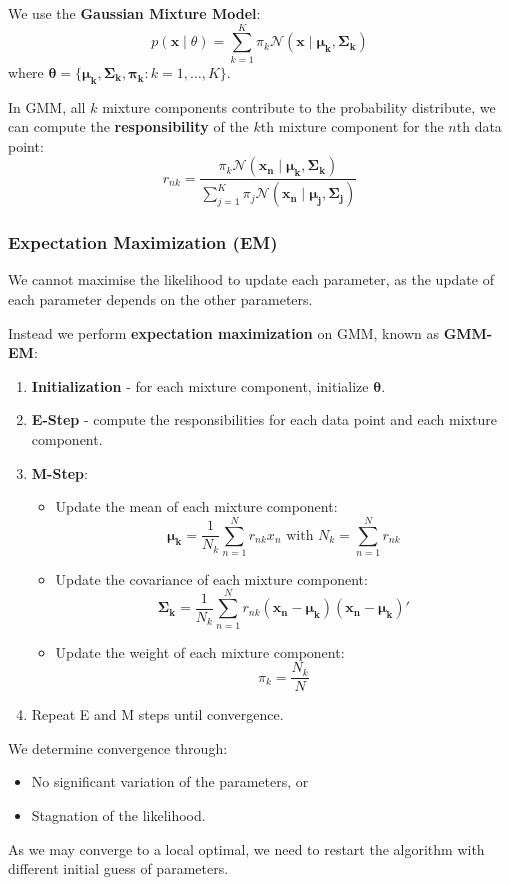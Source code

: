\documentclass[11pt]{article}
\begin{document}
We use the \textbf{Gaussian Mixture Model}:
\[
  p(\bm{x} \mid \theta) = \sum_{k = 1}^K \pi_k \mathcal{N} (\bm{x} \mid \bm{\mu_k}, \bm{\Sigma_k})
\]
where $\bm{\theta} = \{ \bm{\mu_k}, \bm{\Sigma_k}, \bm{\pi_k} : k = 1, \dots, K \}$.

In GMM, all $k$ mixture components contribute to the probability distribute, we can compute the \textbf{responsibility} of the $k$th mixture component for the $n$th data point:
\[
  r_{nk} = \frac{\pi_k \mathcal{N}(\bm{x_n} \mid \bm{\mu_k}, \bm{\Sigma_k})}{\sum_{j = 1}^K \pi_j \mathcal{N} (\bm{x_n} \mid \bm{\mu_j}, \bm{\Sigma_j})
}
\]

\subsubsection{Expectation Maximization (EM)}
We cannot maximise the likelihood to update each parameter, as the update of each parameter depends on the other parameters.

Instead we perform \textbf{expectation maximization} on GMM, known as \textbf{GMM-EM}:
\begin{enumerate}
  \item \textbf{Initialization} - for each mixture component, initialize $\bm{\theta}$.
  \item \textbf{E-Step} - compute the responsibilities for each data point and each mixture component.
  \item \textbf{M-Step}:
    \begin{itemize}
      \item Update the mean of each mixture component:
        \[
          \bm{\mu_k} = \frac{1}{N_k} \sum_{n = 1}^N r_{nk} x_n \text{ with } N_k = \sum_{n = 1}^N r_{nk}
        \]
      \item Update the covariance of each mixture component:
        \[
          \bm{\Sigma_k} = \frac{1}{N_k}\sum_{n = 1}^N r_{nk} (\bm{x_n} - \bm{\mu_k})(\bm{x_n} - \bm{\mu_k})' 
        \]
      \item Update the weight of each mixture component:
        \[
          \pi_k = \frac{N_k}{N} 
        \]
    \end{itemize}
  \item Repeat E and M steps until convergence.
\end{enumerate}

We determine convergence through:
\begin{itemize}
  \item No significant variation of the parameters, or
  \item Stagnation of the likelihood.
\end{itemize}
As we may converge to a local optimal, we need to restart the algorithm with different initial guess of parameters.
\end{document}
